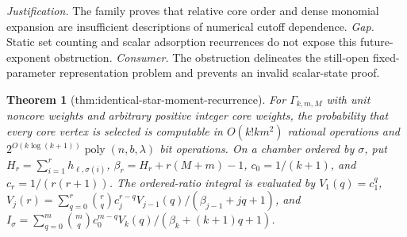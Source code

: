 \documentclass{article}
\newtheorem{theorem}{Theorem}
\begin{document}
\par\smallskip\noindent \textit{Justification.} The family proves that relative core order and dense monomial expansion are insufficient descriptions of numerical cutoff dependence. \textit{Gap.} Static set counting and scalar adsorption recurrences do not expose this future-exponent obstruction. \textit{Consumer.} The obstruction delineates the still-open fixed-parameter representation problem and prevents an invalid scalar-state proof.

\begin{theorem}[thm:identical-star-moment-recurrence]\label{thm:identical-star-moment-recurrence}
For \(\Gamma_{k,m,M}\) with unit noncore weights and arbitrary positive integer core weights, the probability that every core vertex is selected is computable in \(O(k!km^2)\) rational operations and \(2^{O(k\log(k+1))}\operatorname{poly}(n,b,\lambda)\) bit operations. On a chamber ordered by \(\sigma\), put \(H_r=\sum_{i=1}^r h_{\ell,\sigma(i)}\), \(\beta_r=H_r+r(M+m)-1\), \(c_0=1/(k+1)\), and \(c_r=1/(r(r+1))\). The ordered-ratio integral is evaluated by \(V_1(q)=c_1^q\), \(V_j(r)=\sum_{q=0}^r\binom rq c_j^{r-q}V_{j-1}(q)/(\beta_{j-1}+jq+1)\), and \(I_\sigma=\sum_{q=0}^m\binom mq c_0^{m-q}V_k(q)/(\beta_k+(k+1)q+1)\).
\end{theorem}
\end{document}
